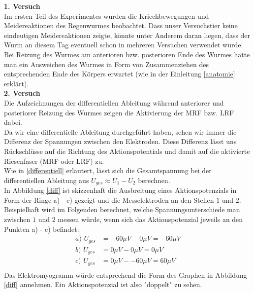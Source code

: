 \documentclass[11pt]{article}
\begin{document}
\textbf{1. Versuch} \\
Im ersten Teil des Experimentes wurden die Kriechbewegungen und Meidereaktionen des Regenwurmes beobachtet. Dass unser Versuchstier keine eindeutigen Meidereaktionen zeigte, könnte unter Anderem daran liegen, dass der Wurm an diesem Tag eventuell schon in mehreren Versuchen verwendet wurde. \\
Bei Reizung des Wurmes am anterioren bzw. posterioren Ende des Wurmes hätte man ein Ausweichen des Wurmes in Form von Zusammenziehen des entsprechenden Ende des Körpers erwartet (wie in der Einleitung \ref{anatomie} erklärt). \\

\textbf{2. Versuch}\\
Die Aufzeichnungen der differentiellen Ableitung während anteriorer und posteriorer Reizung des Wurmes zeigen die Aktivierung der MRF bzw. LRF dabei. \\
Da wir eine differentielle Ableitung durchgeführt haben, sehen wir immer die Differenz der Spannungen zwischen den Elektroden. Diese Differenz lässt uns Rückschlüsse auf die Richtung des Aktionspotentials und damit auf die aktivierte Riesenfaser (MRF oder LRF) zu. \\
Wie in \ref{differentiell} erläutert, lässt sich die Gesamtspannung bei der differentiellen Ableitung aus $U_{ges} \approx U_1 - U_2$ berechnen. \\
In Abbildung \ref{diff} ist skizzenhaft die Ausbreitung eines Aktionspotenzials in Form der Ringe a) - c) gezeigt und die Messelektroden an den Stellen $1$ und $2$. Beispielhaft wird im Folgenden berechnet, welche Spannungsunterschiede man zwischen $1$ und $2$ messen würde, wenn sich das Aktionspotenzial jeweils an den Punkten a) - c) befindet: 
\begin{align*}
a)\,\, U_{ges} &= -60\mu V - 0\mu V =  -60\mu V\\
b)\,\, U_{ges} &= 0\mu V - 0\mu V =  0\mu V\\
c)\,\, U_{ges} &= 0\mu V - -60\mu V =  60\mu V\\
\end{align*}
Das Elektromyogramm würde entsprechend die Form des Graphen in Abbildung \ref{diff} annehmen. Ein Aktionspotenzial ist also "{}doppelt"{} zu sehen. 
\end{document}
